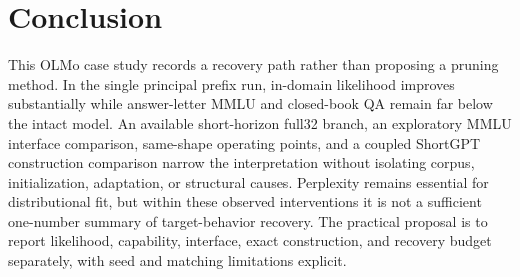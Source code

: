 \section{Conclusion}
\label{sec:conclusion}

This OLMo case study records a recovery path rather than proposing a pruning
method. In the single principal prefix run, in-domain likelihood improves
substantially while answer-letter MMLU and closed-book QA remain far below the
intact model. An available short-horizon full32 branch, an exploratory MMLU
interface comparison, same-shape operating points, and a coupled ShortGPT
construction comparison narrow the interpretation without isolating corpus,
initialization, adaptation, or structural causes. Perplexity remains essential
for distributional fit, but within these observed interventions it is not a
sufficient one-number summary of target-behavior recovery. The practical
proposal is to report likelihood, capability, interface, exact construction,
and recovery budget separately, with seed and matching limitations explicit.
